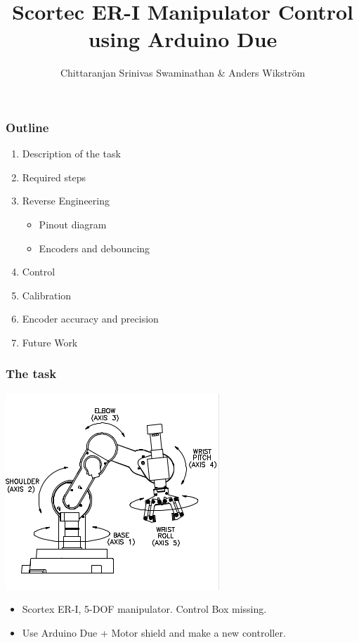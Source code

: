 \documentclass{beamer}
\title[Sensors Assignment 3]
{Scortec ER-I Manipulator Control using Arduino Due}
\author
{Chittaranjan Srinivas Swaminathan \& Anders Wikström}
\institute{Örebro University}
\begin{document}
\frame{\titlepage}
  \begin{frame}
    \frametitle{Outline}
    \begin{enumerate}
      \item Description of the task
      \item Required steps
      \item Reverse Engineering
        \begin{itemize}
          \item Pinout diagram
          \item Encoders and debouncing
        \end{itemize}
      \item Control
      \item Calibration
      \item Encoder accuracy and precision
      \item Future Work
    \end{enumerate}

  \end{frame}
  \begin{frame}
    \frametitle{The task}
    \centering
    \includegraphics[scale=0.75]{../Report/axes.png}
    \begin{itemize}
      \item<1-> Scortex ER-I, 5-DOF manipulator. Control Box missing.
      \item<2-> Use Arduino Due + Motor shield and make a new controller.
    \end{itemize}
  \end{frame}
  
\end{document}
